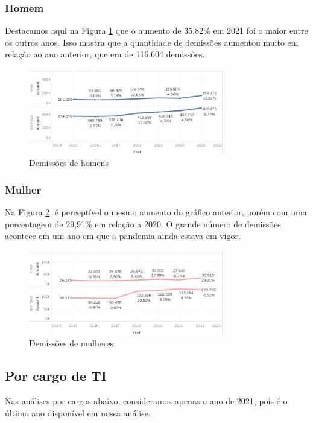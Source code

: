 \subsubsection{Homem}

Destacamos aqui na Figura \ref{fig_4_qnt_h_demit} que o aumento de 35,82\% em 2021 foi o maior entre os outros anos. Isso mostra que a quantidade de demissões aumentou muito em relação ao ano anterior, que era de 116.604 demissões. 

\begin{figure}[htbp]
	\centerline{
		\includegraphics[width=85mm]{assets/4_qnt_h_demit.PNG}
	}
	\caption{Demissões de homens}
	\label{fig_4_qnt_h_demit}
\end{figure}

\subsubsection{Mulher}

Na Figura \ref{fig_4_qnt_m_demit}, é perceptível o mesmo aumento do gráfico anterior, porém com uma porcentagem de 29,91\% em relação a 2020. O grande número de demissões acontece em um ano em que a pandemia ainda estava em vigor. 

\begin{figure}[htbp]
	\centerline{
		\includegraphics[width=85mm]{assets/4_qnt_m_demit.PNG}
	}
	\caption{Demissões de mulheres}
	\label{fig_4_qnt_m_demit}
\end{figure}

\subsection{Por cargo de TI}

Nas análises por cargos abaixo, consideramos apenas o ano de 2021, pois é o último ano disponível em nossa análise.

